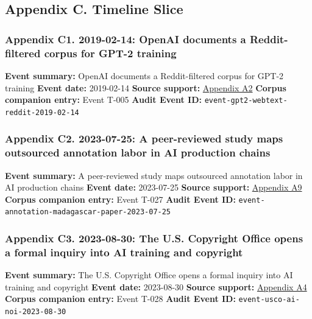 \documentclass[
  american,
  11pt,
  letterpaper,
]{article}
\begin{document}
\subsection{Appendix C. Timeline
Slice}\label{appendix-c.-timeline-slice}

\subsubsection{Appendix C1. 2019-02-14: OpenAI documents a
Reddit-filtered corpus for GPT-2
training}\label{appendix-c1-2019-02-14-openai-documents-a-reddit-filtered-corpus-for-gpt-2-training}

\textbf{Event summary:} OpenAI documents a Reddit-filtered corpus for
GPT-2 training \textbf{Event date:} 2019-02-14 \textbf{Source support:}
\hyperref[appendix-a2-language-models-are-unsupervised-multitask-learners]{Appendix
A2} \textbf{Corpus companion entry:} Event T-005 \textbf{Audit Event
ID:} \texttt{event-gpt2-webtext-reddit-2019-02-14}

\subsubsection{Appendix C2. 2023-07-25: A peer-reviewed study maps
outsourced annotation labor in AI production
chains}\label{appendix-c2-2023-07-25-a-peer-reviewed-study-maps-outsourced-annotation-labor-in-ai-production-chains}

\textbf{Event summary:} A peer-reviewed study maps outsourced annotation
labor in AI production chains \textbf{Event date:} 2023-07-25
\textbf{Source support:}
\hyperref[appendix-a9-the-problem-with-annotation-human-labour-and-outsourcing-between-france-and-madagascar]{Appendix
A9} \textbf{Corpus companion entry:} Event T-027 \textbf{Audit Event
ID:} \texttt{event-annotation-madagascar-paper-2023-07-25}

\subsubsection{Appendix C3. 2023-08-30: The U.S. Copyright Office opens
a formal inquiry into AI training and
copyright}\label{appendix-c3-2023-08-30-the-u-s-copyright-office-opens-a-formal-inquiry-into-ai-training-and-copyright}

\textbf{Event summary:} The U.S. Copyright Office opens a formal inquiry
into AI training and copyright \textbf{Event date:} 2023-08-30
\textbf{Source support:}
\hyperref[appendix-a4-copyright-and-artificial-intelligence-notice-of-inquiry]{Appendix
A4} \textbf{Corpus companion entry:} Event T-028 \textbf{Audit Event
ID:} \texttt{event-usco-ai-noi-2023-08-30}
\end{document}

